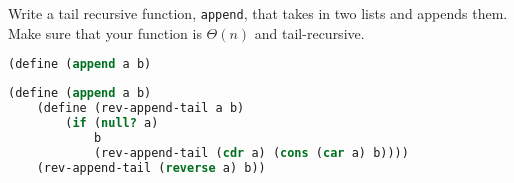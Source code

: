\question
Write a tail recursive function, \texttt{append}, that takes in two lists and
appends them. Make sure that your function is $\Theta(n)$ and tail-recursive.

\begin{lstlisting}[language=Scheme]
(define (append a b)
\end{lstlisting}
\begin{solution}[1.5in]
\begin{lstlisting}[language=Scheme]
(define (append a b)
    (define (rev-append-tail a b)
        (if (null? a)
            b
            (rev-append-tail (cdr a) (cons (car a) b))))
    (rev-append-tail (reverse a) b))
\end{lstlisting}
\end{solution}
